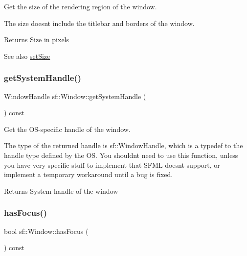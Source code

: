Get the size of the rendering region of the window. 

The size doesn\textquotesingle{}t include the titlebar and borders of the window.

\begin{DoxyReturn}{Returns}
Size in pixels
\end{DoxyReturn}
\begin{DoxySeeAlso}{See also}
\hyperlink{classsf_1_1_window_ab94ea32f22d15c0df11588e319de2546}{set\+Size} 
\end{DoxySeeAlso}
\mbox{\label{classsf_1_1_window_ad2fa6be5104ec0bfe79af7a5f524ea90}} 
\subsubsection{\texorpdfstring{get\+System\+Handle()}{getSystemHandle()}}
{\footnotesize\ttfamily Window\+Handle sf\+::\+Window\+::get\+System\+Handle (\begin{DoxyParamCaption}{ }\end{DoxyParamCaption}) const}



Get the O\+S-\/specific handle of the window. 

The type of the returned handle is sf\+::\+Window\+Handle, which is a typedef to the handle type defined by the OS. You shouldn\textquotesingle{}t need to use this function, unless you have very specific stuff to implement that S\+F\+ML doesn\textquotesingle{}t support, or implement a temporary workaround until a bug is fixed.

\begin{DoxyReturn}{Returns}
System handle of the window 
\end{DoxyReturn}
\mbox{\label{classsf_1_1_window_ad8db2e6500d13ca9396281296404ba31}} 
\subsubsection{\texorpdfstring{has\+Focus()}{hasFocus()}}
{\footnotesize\ttfamily bool sf\+::\+Window\+::has\+Focus (\begin{DoxyParamCaption}{ }\end{DoxyParamCaption}) const}



